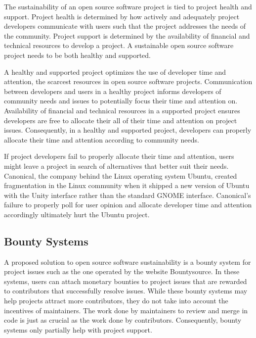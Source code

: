 The sustainability of an open source software project is tied to project health
and support. Project health is determined by how actively and adequately project
developers communicate with users such that the project
addresses the needs of the community. Project support is determined by the
availability of financial and technical resources to develop a project\cite{successOSS}. A sustainable
open source software project needs to be both healthy and supported.

A healthy and supported project optimizes the use of developer time and
attention, the scarcest resources in open source software projects.
Communication between developers and users in a healthy project informs
developers of community needs and issues to potentially focus their time and
attention on. Availability of financial and technical resources in a supported
project ensures developers are free to allocate their all of their time and attention on
project issues. Consequently, in a healthy and supported project, developers can
properly allocate their time and attention according to community needs.

If project developers fail to properly allocate their time and attention, users
might leave a project in search of alternatives that better suit
their needs. Canonical, the company behind the Linux operating system Ubuntu,
created fragmentation in the Linux community when it shipped a new version of
Ubuntu with the Unity interface rather than the standard GNOME
interface\cite{ubuntuUnity}. Canonical's failure to properly poll for user
opinion and allocate developer time and attention accordingly ultimately hurt
the Ubuntu project.

\subsection{Bounty Systems}

A proposed solution to open source software sustainability is a bounty system
for project issues such as the one operated by the website
Bountysource\cite{bountysource}. In these systems, users can attach monetary
bounties to project issues that are rewarded to contributors that successfully
resolve issues. While these bounty systems may help projects attract more
contributors, they do not take into account the incentives of maintainers. The
work done by maintainers to review and merge in code is just
as crucial as the work done by contributors. Consequently, bounty systems only
partially help with project support.

